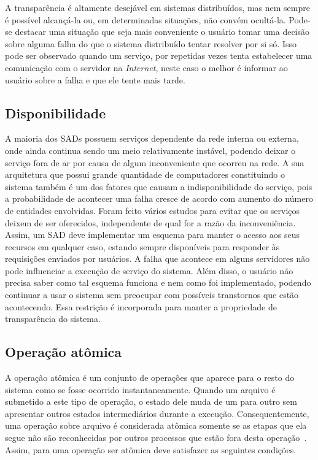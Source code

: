 	
	A transparência é altamente desejável em sistemas distribuídos, mas nem sempre é possível alcançá-la ou, em determinadas situações, não convém ocultá-la. Pode-se destacar uma situação que seja mais conveniente o usuário tomar uma decisão sobre
	alguma falha do que o sistema distribuído tentar resolver por si só. Isso pode ser observado quando um serviço, por repetidas vezes tenta estabelecer uma comunicação com o servidor na \textit{Internet}, neste caso o melhor é informar ao usuário sobre a falha e que ele tente mais tarde.
	
	
	
	\subsection{Disponibilidade}
	A maioria dos SADs possuem serviços dependente da rede interna ou externa, onde ainda continua sendo um meio relativamente instável, podendo deixar o serviço fora de ar por causa de algum inconveniente que ocorreu na rede. 
	A sua arquitetura que possui grande quantidade de computadores constituindo o sistema também é um dos fatores que causam a indisponibilidade do serviço, pois a probabilidade de acontecer uma falha cresce de acordo com aumento do número de entidades envolvidas. 
	Foram feito vários estudos para evitar que os serviços deixem de ser oferecidos, independente de qual for a razão da inconveniência. 
	Assim, um SAD deve implementar um esquema para manter o acesso aos seus recursos em qualquer caso, estando sempre disponíveis para responder às requisições enviados por usuários. A falha que acontece em alguns servidores não pode influenciar a execução de serviço do sistema. 
	Além disso, o usuário não precisa saber como tal esquema funciona e nem como foi implementado, podendo continuar a usar o sistema sem preocupar com possíveis transtornos que estão acontecendo. 
	Essa restrição é incorporada para manter a propriedade de transparência do sistema.
	
	\subsection{Operação atômica}
	A operação atômica é um conjunto de operações que aparece para o resto do sistema como se fosse ocorrido instantaneamente.
	Quando um arquivo é submetido a este tipo de operação, o estado dele muda de um para outro sem apresentar outros estados intermediários durante a execução.
	Consequentemente, uma operação sobre arquivo é considerada atômica somente se as etapas que ela segue não são reconhecidas por outros processos que estão fora desta operação~\cite{tanenbaum07_2}. 
	Assim, para uma operação ser atômica deve satisfazer as seguintes condições.
	
